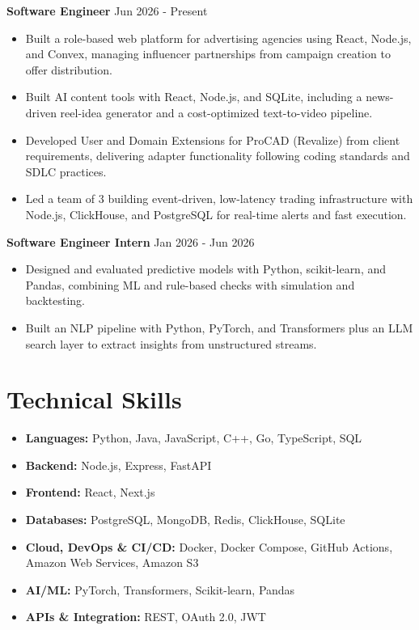 \documentclass[a4paper,11pt]{article}
\newcommand{\resumeItem}[1]{\item \small{#1}}
\newcommand{\resumeSubHeadingListStart}{\begin{itemize}}
\newcommand{\resumeSubHeadingListEnd}{\end{itemize}}
\begin{document}
\textbf{Software Engineer} \hfill {Jun 2026 - Present}
\resumeSubHeadingListStart
\resumeItem{Built a role-based web platform for advertising agencies using React, Node.js, and Convex, managing influencer partnerships from campaign creation to offer distribution.}
\resumeItem{Built AI content tools with React, Node.js, and SQLite, including a news-driven reel-idea generator and a cost-optimized text-to-video pipeline.}
\resumeItem{Developed User and Domain Extensions for ProCAD (Revalize) from client requirements, delivering adapter functionality following coding standards and SDLC practices.}
\resumeItem{Led a team of 3 building event-driven, low-latency trading infrastructure with Node.js, ClickHouse, and PostgreSQL for real-time alerts and fast execution.}
\resumeSubHeadingListEnd

\textbf{Software Engineer Intern} \hfill {Jan 2026 - Jun 2026}
\resumeSubHeadingListStart
\resumeItem{Designed and evaluated predictive models with Python, scikit-learn, and Pandas, combining ML and rule-based checks with simulation and backtesting.}
\resumeItem{Built an NLP pipeline with Python, PyTorch, and Transformers plus an LLM search layer to extract insights from unstructured streams.}
\resumeSubHeadingListEnd


\section*{Technical Skills}
\begin{itemize}
\item \textbf{Languages:} Python, Java, JavaScript, C++, Go, TypeScript, SQL
\item \textbf{Backend:} Node.js, Express, FastAPI
\item \textbf{Frontend:} React, Next.js
\item \textbf{Databases:} PostgreSQL, MongoDB, Redis, ClickHouse, SQLite
\item \textbf{Cloud, DevOps \& CI/CD:} Docker, Docker Compose, GitHub Actions, Amazon Web Services, Amazon S3
\item \textbf{AI/ML:} PyTorch, Transformers, Scikit-learn, Pandas
\item \textbf{APIs \& Integration:} REST, OAuth 2.0, JWT
\end{itemize}
\vspace{-0.2em}
\end{document}
